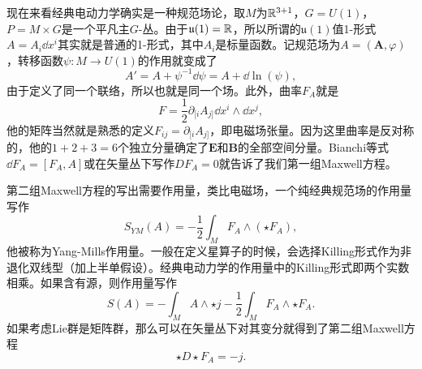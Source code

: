 现在来看经典电动力学确实是一种规范场论，取$M$为$\mathbb{R}^{3+1}$，$G=U(1)$，$P=M\times G$是一个平凡主$G$-丛。由于$\mathfrak{u}(1)=\mathbb{R}$，所以所谓的$\mathfrak{u}(1)$值1-形式$A=A_i\dd x^i$其实就是普通的1-形式，其中$A_i$是标量函数。记规范场为$A=(\bm{A},\varphi)$，转移函数$\psi:M\to U(1)$的作用就变成了
\[
	A'=A+\psi^{-1} \dd \psi=A+\dd \ln(\psi),
\]
由于定义了同一个联络，所以也就是同一个场。此外，曲率$F_A$就是
\[
	F=\frac{1}{2}\partial_{[i}A_{j]}\dd x^i\wedge \dd x^j,
\]
他的矩阵当然就是熟悉的定义$F_{ij}=\partial_{[i}A_{j]}$，即电磁场张量。因为这里曲率是反对称的，他的$1+2+3=6$个独立分量确定了$\bm{E}$和$\bm{B}$的全部空间分量。Bianchi等式$\dd F_A=[F_A,A]$或在矢量丛下写作$DF_A=0$就告诉了我们第一组Maxwell方程。

第二组Maxwell方程的写出需要作用量，类比电磁场，一个纯经典规范场的作用量写作
\[
	S_{YM}(A)=-\frac{1}{2}\int_M F_A\wedge(\star F_A),
\]
他被称为Yang-Mills作用量。一般在定义星算子的时候，会选择Killing形式作为非退化双线型（加上半单假设）。经典电动力学的作用量中的Killing形式即两个实数相乘。如果含有源，则作用量写作
\[
	S(A)=-\int_M A\wedge\star j-\frac{1}{2}\int_M F_A\wedge\star F_A.
\]
如果考虑Lie群是矩阵群，那么可以在矢量丛下对其变分就得到了第二组Maxwell方程
\[
	\star D\star F_A=-j.
\]